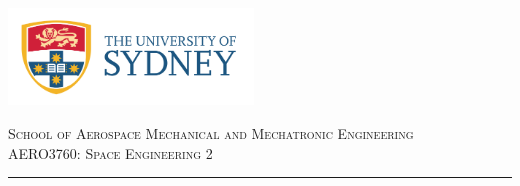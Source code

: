 \begin{titlepage}

\thispagestyle{empty}
\begin{center}
\begin{minipage}{\linewidth}
    \centering
    \includegraphics[width=6.5cm]{logo.png}
    \par
    \vspace{1.2cm}
    {\textsc{School of Aerospace Mechanical and Mechatronic Engineering \\ \vspace{0.3cm}
            AERO3760: Space Engineering 2}}
   \vspace{0.7cm}
	\hrule
    \vspace{1.5cm}
    {{\LARGE{}\par}}


\end{minipage}
\end{center}
\end{titlepage}
